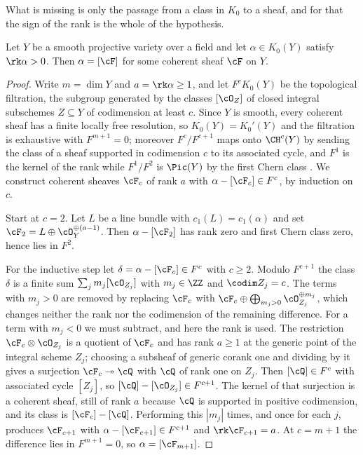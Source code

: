 What is missing is only the passage from a class in $K_{0}$ to a sheaf, and
for that the sign of the rank is the whole of the hypothesis.

\begin{lemma}\label{lem:posrank}
Let $Y$ be a smooth projective variety over a field and let $\alpha\in
K_{0}(Y)$ satisfy $\rk\alpha>0$. Then $\alpha=[\cF]$ for some coherent sheaf
$\cF$ on $Y$.
\end{lemma}

\begin{proof}
Write $m=\dim Y$ and $a=\rk\alpha\ge1$, and let $F^{c}K_{0}(Y)$ be the
topological filtration, the subgroup generated by the classes $[\cO_{Z}]$ of
closed integral subschemes $Z\subseteq Y$ of codimension at least $c$. Since
$Y$ is smooth, every coherent sheaf has a finite locally free resolution, so
$K_{0}(Y)=K_{0}'(Y)$ and the filtration is exhaustive with $F^{m+1}=0$;
moreover $F^{c}/F^{c+1}$ maps onto $\CH^{c}(Y)$ by sending the class of a sheaf
supported in codimension $c$ to its associated cycle, and $F^{1}$ is the kernel
of the rank while $F^{1}/F^{2}$ is $\Pic(Y)$ by the first Chern class
\cite[\S 15.1 and Ex.~15.1.5]{Ful98}. We construct coherent
sheaves $\cF_{c}$ of rank $a$ with $\alpha-[\cF_{c}]\in F^{c}$, by induction on
$c$.

Start at $c=2$. Let $L$ be a line bundle with $c_{1}(L)=c_{1}(\alpha)$ and set
$\cF_{2}=L\oplus\cO_{Y}^{\oplus(a-1)}$. Then $\alpha-[\cF_{2}]$ has rank zero
and first Chern class zero, hence lies in $F^{2}$.

For the inductive step let $\delta=\alpha-[\cF_{c}]\in F^{c}$ with $c\ge2$.
Modulo $F^{c+1}$ the class $\delta$ is a finite sum $\sum_{j}m_{j}
[\cO_{Z_{j}}]$ with $m_{j}\in\ZZ$ and $\codim Z_{j}=c$. The terms with
$m_{j}>0$ are removed by replacing $\cF_{c}$ with $\cF_{c}\oplus\bigoplus_{
m_{j}>0}\cO_{Z_{j}}^{\oplus m_{j}}$, which changes neither the rank nor the
codimension of the remaining difference. For a term with $m_{j}<0$ we must
subtract, and here the rank is used. The restriction $\cF_{c}\otimes
\cO_{Z_{j}}$ is a quotient of $\cF_{c}$ and has rank $a\ge1$ at the generic
point of the integral scheme $Z_{j}$; choosing a subsheaf of generic corank
one and dividing by it gives a surjection $\cF_{c}\twoheadrightarrow\cQ$ with
$\cQ$ of rank one on $Z_{j}$. Then $[\cQ]\in F^{c}$ with associated cycle
$[Z_{j}]$, so $[\cQ]-[\cO_{Z_{j}}]\in F^{c+1}$. The kernel of that surjection
is a coherent sheaf, still of rank $a$ because $\cQ$ is supported in positive
codimension, and its class is $[\cF_{c}]-[\cQ]$. Performing this $|m_{j}|$
times, and once for each $j$, produces $\cF_{c+1}$ with
$\alpha-[\cF_{c+1}]\in F^{c+1}$ and $\rk\cF_{c+1}=a$. At $c=m+1$ the
difference lies in $F^{m+1}=0$, so $\alpha=[\cF_{m+1}]$.
\end{proof}

